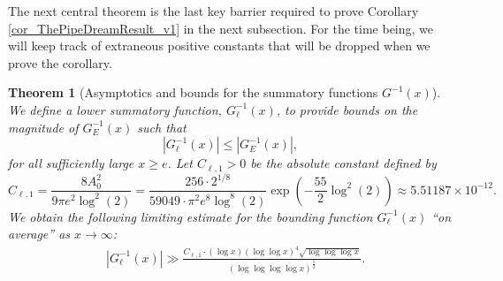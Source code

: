 \documentclass[11pt,reqno,a4letter]{article}
\numberwithin{figure}{section}
\numberwithin{table}{section}
\theoremstyle{plain}
\newtheorem{theorem}{Theorem}
\numberwithin{theorem}{section}
\theoremstyle{definition}
\newcommand{\NBRef}[1]{}
\newcommand{\SuccSim}[0]{\overset{_{\scriptsize{\blacktriangle}}}{\succsim}}
\renewcommand{\SuccSim}[0]{\ensuremath{\gg}}
\begin{document}
The next central theorem is the last key barrier required to prove 
Corollary \ref{cor_ThePipeDreamResult_v1} 
in the next subsection. For the time being, we will keep track of extraneous positive 
constants that will be dropped when we prove the corollary. 

\begin{theorem}[Asymptotics and bounds for the summatory functions $G^{-1}(x)$] 
\label{theorem_gInv_GeneralAsymptoticsForms}
We define a lower summatory function, $G_{\ell}^{-1}(x)$, 
to provide bounds on the magnitude of $G_E^{-1}(x)$ such that 
$$|G_{\ell}^{-1}(x)| \leq |G_E^{-1}(x)|,$$ 
for all sufficiently large $x \geq e$. 
Let $C_{\ell,1} > 0$ be the absolute constant defined by 
\[
C_{\ell,1} = \frac{8 A_0^2}{9 \pi e^2 \log^2(2)}  = 
     \frac{256 \cdot 2^{1/8}}{59049 \cdot \pi^2 e^8 \log^8(2)} 
     \exp\left(-\frac{55}{2} \log^2(2)\right) 
     \approx 5.51187 \times 10^{-12}.  
\]
We obtain the following limiting estimate for the bounding function 
$G_{\ell}^{-1}(x)$ ``on average'' as $x \rightarrow \infty$:   
\begin{align*} 
 & \left\lvert G_{\ell}^{-1}\left(x\right) \right\rvert
     \SuccSim 
     \frac{C_{\ell,1} \cdot (\log x) (\log\log x)^{4} \sqrt{\log\log\log x}}{ 
     (\log\log\log\log x)^{\frac{5}{2}}}. 
\end{align*} 
\end{theorem} 
\NBRef{A10-2020.04-26} 
\end{document}
